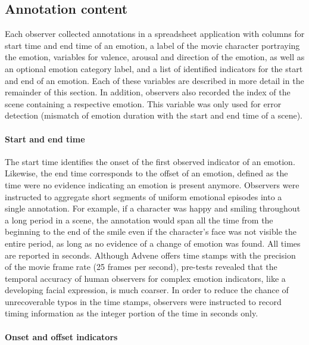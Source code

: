 \subsection*{Annotation content}

Each observer collected annotations in a spreadsheet application with columns
for start time and end time of an emotion, a label of the movie character
portraying the emotion, variables for valence, arousal and direction of the
emotion, as well as an optional emotion category label, and a list of
identified indicators for the start and end of an emotion. Each of these
variables are described in more detail in the remainder of this section. In
addition, observers also recorded the index of the scene containing a
respective emotion. This variable was only used for error detection (mismatch
of emotion duration with the start and end time of a scene).

\paragraph{Start and end time}

The start time identifies the onset of the first observed indicator of an
emotion. Likewise, the end time corresponds to the offset of an emotion,
defined as the time were no evidence indicating an emotion is present anymore.
Observers were instructed to aggregate short segments of uniform emotional
episodes into a single annotation. For example, if a character was happy and
smiling throughout a long period in a scene, the annotation would span all the
time from the beginning to the end of the smile even if the character's face was
not visible the entire period, as long as no evidence of a change of emotion
was found.  All times are reported in seconds. Although Advene offers time
stamps with the precision of the movie frame rate (25 frames per second),
pre-tests revealed that the temporal accuracy of human observers for complex
emotion indicators, like a developing facial expression, is much coarser. In
order to reduce the chance of unrecoverable typos in the time stamps, observers
were instructed to record timing information as the integer portion of the time
in seconds only.

\paragraph{Onset and offset indicators}

